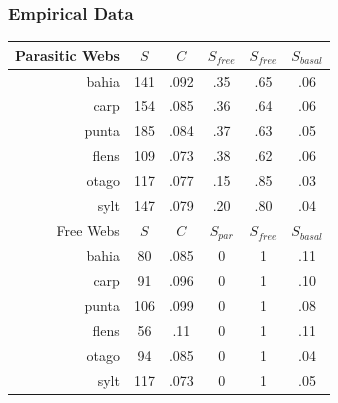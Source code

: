 \documentclass{beamer}
\begin{document}
\begin{frame}
\frametitle{Empirical Data}
\begin{tabular}{|r| c c c c c |}
\hline
Parasitic Webs&$S$&$C$&$S_{free}$&$S_{free}$&$S_{basal}$\\
\hline
bahia&141&.092 &.35&.65&.06\\
carp&154&.085&.36&.64&.06\\
punta&185&.084&.37&.63&.05\\
flens&109&.073&.38&.62&.06\\
otago&117&.077&.15&.85&.03\\
sylt&147&.079&.20&.80&.04\\
\hline
\hline
Free Webs&$S$&$C$&$S_{par}$&$S_{free}$&$S_{basal}$\\
\hline
bahia&80&.085 &0&1&.11\\
carp&91&.096&0&1&.10\\
punta&106&.099&0&1&.08\\
flens&56&.11&0&1&.11\\
otago&94&.085&0&1&.04\\
sylt&117&.073&0&1&.05\\
\hline
\end{tabular}
\end{frame}
\end{document}
